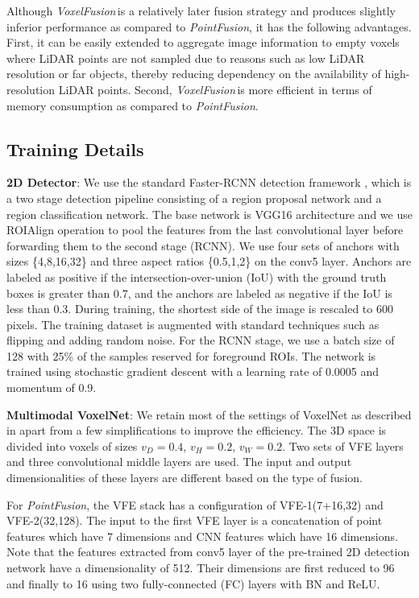 \documentclass[letterpaper, 10 pt, conference]{ieeeconf}
\newcommand{\PF}{\textit{PointFusion}}
\newcommand{\VF}{\textit{VoxelFusion}}
\begin{document}
Although \VF{\,}is a relatively later fusion strategy and produces slightly inferior performance as compared to \PF, it has the following advantages. First, it can be easily extended to aggregate image information to empty voxels where LiDAR points are not sampled due to reasons such as low LiDAR resolution or far objects, thereby reducing dependency on the availability of high-resolution LiDAR points. Second, \VF{\,}is more efficient in terms of memory consumption as compared to \PF.






\subsection{Training Details}
\label{ssec:training}


\noindent\textbf{2D Detector}: We use the standard Faster-RCNN detection framework \cite{ren2015faster}, which is a two stage detection pipeline consisting of a region proposal network and a region classification network. The base network is VGG16 architecture and we use ROIAlign \cite{he2017mask} operation to pool the features from the last convolutional layer before forwarding them to the second stage (RCNN). We use four sets of anchors with sizes \{4,8,16,32\} and three aspect ratios \{0.5,1,2\} on the conv5 layer. Anchors are labeled as positive if the intersection-over-union (IoU) with the ground truth boxes is greater than 0.7, and the anchors are labeled as negative if the IoU is less than 0.3. During training, the shortest side of the image is rescaled to 600 pixels. The training dataset is augmented with standard techniques such as flipping and adding random noise. For the RCNN stage, we use a batch size of 128 with 25\% of the samples reserved for foreground ROIs. The network is trained using stochastic gradient descent with a learning rate of 0.0005 and momentum of 0.9. 


\noindent\textbf{Multimodal VoxelNet}: We retain most of the settings of VoxelNet as described in \cite{REF:zhou2017voxelnet} apart from a few simplifications to improve the efficiency. 
The 3D space is divided into voxels of sizes $v_D=0.4$, $v_H=0.2$, $v_W=0.2$. Two sets of VFE layers and three convolutional middle layers are used. The input and output dimensionalities of these layers are different based on the type of fusion. 

For \PF, the VFE stack has a configuration of VFE-1(7+16,32) and VFE-2(32,128). The input to the first VFE layer is a concatenation of point features which have 7 dimensions and CNN features which have 16 dimensions. Note that the features extracted from conv5 layer of the pre-trained 2D detection network have a dimensionality of 512. Their dimensions are first reduced to 96 and finally to 16 using two fully-connected (FC) layers with BN and ReLU. 
\end{document}
